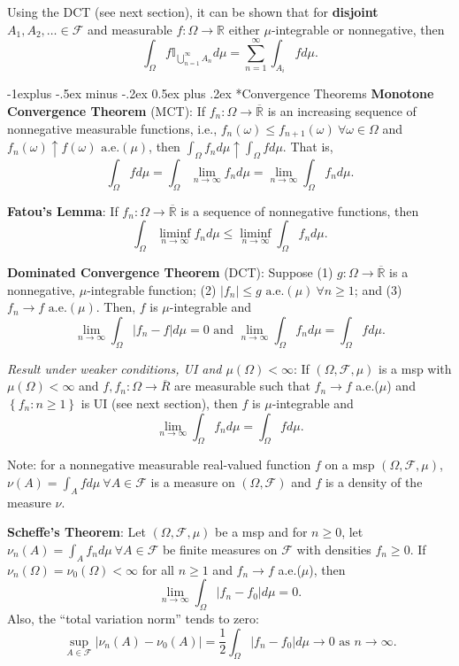 \documentclass[paper=letter,fontsize=3mm]{scrartcl}
\makeatletter
\newcommand{\R}{\mathbb{R}}
\newcommand\indicate[1]{\mathbb{I}_{ #1 }}
\newcommand\abs[1]{\left| #1 \right|}
\newcommand\set[1]{\left\{ #1 \right\}}
\renewcommand{\subsection}{\@startsection{subsection}{2}{0mm}%
                                {-1explus -.5ex minus -.2ex}%
                                {0.5ex plus .2ex}%
                                {\normalfont\normalsize\bfseries}}
\makeatother
\begin{document}
\begin{multicols*}{3}
Using the DCT (see next section), it can be shown that for \textbf{disjoint} $A_1, A_2, \dots \in \mathcal{F}$ and measurable $f: \Omega \to \R$ either $\mu$-integrable or nonnegative, then 
$$\int_\Omega f \indicate{\bigcup_{n=1}^\infty A_n}d\mu = \sum_{n=1}^\infty \int_{A_i} f d\mu.$$

\subsection*{Convergence Theorems}
\textbf{Monotone Convergence Theorem} (MCT): If $f_n: \Omega \to \overline{\R}$ is an increasing sequence of nonnegative measurable functions, i.e., $f_n(\omega) \le f_{n+1}(\omega) ~\forall \omega \in \Omega$ and $f_n(\omega) \uparrow f(\omega) \text{ a.e.}(\mu)$, then $\int_\Omega f_n d\mu \uparrow \int_\Omega f d\mu$. That is,
$$\int_\Omega f d\mu = \int_\Omega \lim_{n\to\infty} f_nd\mu = \lim_{n\to\infty}\int_\Omega f_nd\mu.$$

\textbf{Fatou's Lemma}:
If $f_n: \Omega \to \overline{\R}$ is a sequence of nonnegative functions, then $$\int_\Omega \liminf_{n\to\infty} f_n d\mu \le \liminf_{n\to\infty}  \int_\Omega f_n d\mu.$$

\textbf{Dominated Convergence Theorem} (DCT): 
Suppose (1) $g: \Omega \to \overline{\R}$ is a nonnegative, $\mu$-integrable function; (2) $\abs{f_n} \le g \text{ a.e.}(\mu) ~\forall n \ge 1$; and (3) $f_n \to f \text{ a.e.}(\mu)$. Then, $f$ is $\mu$-integrable and $$\lim_{n\to\infty}\int_\Omega \abs{f_n - f} d\mu = 0 \text{ and } \lim_{n\to\infty} \int_\Omega f_nd\mu = \int_\Omega fd\mu.$$

\emph{Result under weaker conditions, UI and $\mu(\Omega) < \infty$}: If $(\Omega, \mathcal{F}, \mu)$ is a msp with $\mu(\Omega) < \infty$ and $f,f_n: \Omega \to \overline{R}$ are measurable such that $f_n \to f$ a.e.($\mu$) and $\set{f_n: n \ge1}$ is UI (see next section), then $f$ is $\mu$-integrable and $$\lim_{n\to\infty} \int_\Omega f_nd\mu = \int_\Omega f d\mu.$$

Note: for a nonnegative measurable real-valued function $f$ on a msp $(\Omega, \mathcal{F}, \mu)$, $\nu(A) = \int_A fd\mu ~\forall A \in \mathcal{F}$ is a measure on $(\Omega, \mathcal{F})$ and $f$ is a density of the measure $\nu$. \\\medskip

\textbf{Scheffe's Theorem}: Let $(\Omega, \mathcal{F}, \mu)$ be a msp and for $n \ge 0$, let $\nu_n(A) = \int_A f_n d\mu ~\forall A \in \mathcal{F}$ be finite measures on $\mathcal{F}$ with densities $f_n \ge 0$. If $\nu_n(\Omega) = \nu_0(\Omega) < \infty$ for all $n \ge 1$ and $f_n \to f$ a.e.($\mu$), then $$\lim_{n\to\infty} \int_\Omega \abs{f_n-f_0}d\mu = 0.$$
Also, the ``total variation norm'' tends to zero: 
$$\sup_{A\in\mathcal{F}} \abs{\nu_n(A) - \nu_0(A)} =\frac{1}{2}\int_\Omega \abs{f_n - f_0}d\mu \to 0 \text{ as } n \to \infty.$$


\end{multicols*}
\end{document}
